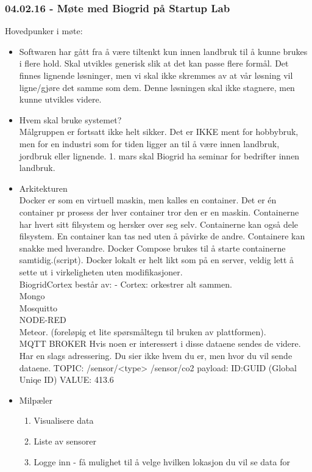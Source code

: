 \documentclass[12pt, oneside]{article}
\begin{document}
\subsubsection{04.02.16 - Møte med Biogrid på Startup Lab}
Hovedpunker i møte:
\begin{itemize}
	\item Softwaren har gått fra å være tiltenkt kun innen landbruk til å kunne brukes i flere hold. Skal utvikles generisk slik at det kan passe flere 			formål. Det finnes lignende løsninger, men vi skal ikke skremmes av at vår løsning vil ligne/gjøre det samme som dem. Denne løsningen 			skal ikke stagnere, men kunne utvikles videre.
	\item Hvem skal bruke systemet?\\
	 	Målgruppen er fortsatt ikke helt sikker. Det er IKKE ment for hobbybruk, men for en industri som for tiden ligger an til å være 					innen landbruk, jordbruk eller lignende. 1. mars skal Biogrid ha seminar for bedrifter innen landbruk.
	\item Arkitekturen\\
		Docker er som en virtuell maskin, men kalles en container. Det er én container pr prosess der hver container tror den er en maskin. 				Containerne har hvert sitt filsystem og hersker over seg selv. Containerne kan også dele filsystem. En container kan tas ned uten å påvirke 		de andre. Containere kan snakke med hverandre. Docker Compose brukes til å starte containerne samtidig.(script). Docker lokalt er helt likt 		som på en server, veldig lett å sette ut i virkeligheten uten modifikasjoner.\\
	
		 BiogridCortex består av: - Cortex: orkestrer alt sammen. \\
		 Mongo\\
		 Mosquitto\\
		 NODE-RED\\
		 Meteor. (foreløpig et lite spørsmåltegn til bruken av plattformen).\\
		 MQTT BROKER Hvis noen er interessert i disse dataene sendes de videre. Har en slags adressering. Du sier ikke hvem du er, men hvor 		du vil sende dataene. TOPIC: /sensor/<type> /sensor/co2 payload: ID:GUID (Global Uniqe ID) VALUE: 413.6
		 
	\item Milpæler
		\begin{enumerate}
			\item Visualisere data
			\item Liste av sensorer
			\item Logge inn - få mulighet til å velge hvilken lokasjon du vil se data for
		\end{enumerate}
		

\end{itemize}
\end{document}
